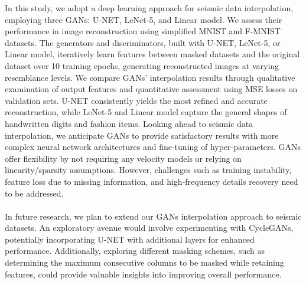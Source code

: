 In this study, we adopt a deep learning approach for seismic data interpolation, employing three GANs: U-NET, LeNet-5, and Linear model. We assess their performance in image reconstruction using simplified MNIST and F-MNIST datasets. The generators and discriminators, built with U-NET, LeNet-5, or Linear model, iteratively learn features between masked datasets and the original dataset over 10 training epochs, generating reconstructed images at varying resemblance levels. We compare GANs' interpolation results through qualitative examination of output features and quantitative assessment using MSE losses on validation sets. U-NET consistently yields the most refined and accurate reconstruction, while LeNet-5 and Linear model capture the general shapes of handwritten digits and fashion items. Looking ahead to seismic data interpolation, we anticipate GANs to provide satisfactory results with more complex neural network architectures and fine-tuning of hyper-parameters. GANs offer flexibility by not requiring any velocity models or relying on linearity/sparsity assumptions. However, challenges such as training instability, feature loss due to missing information, and high-frequency details recovery need to be addressed.
\\\\
In future research, we plan to extend our GANs interpolation approach to seismic datasets. An exploratory avenue would involve experimenting with CycleGANs, potentially incorporating U-NET with additional layers for enhanced performance. Additionally, exploring different masking schemes, such as determining the maximum consecutive columns to be masked while retaining features, could provide valuable insights into improving overall performance.
